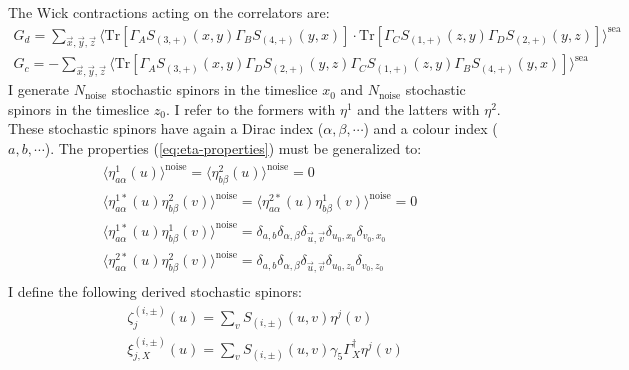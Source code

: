 \documentclass[english, LaM, oneside, noexaminfo]{sapthesis}
\begin{document}
\newline
The Wick contractions acting on the correlators are:
\begin{equation}\label{eq:contractions-stochastic-method}
    \begin{gathered}
        G_d = \sum_{\vec x, \vec y, \vec z} \bigg\langle \text{Tr}\left[\Gamma_A S_{(3,+)}(x,y)\Gamma_B S_{(4,+)}(y,x)\right]\cdot\text{Tr}\left[\Gamma_C S_{(1,+)}(z,y)\Gamma_D S_{(2,+)}(y,z)\right] \bigg\rangle^{\text{sea}} \\
        G_c = - \sum_{\vec x, \vec y, \vec z} \bigg\langle \text{Tr}\left[\Gamma_A S_{(3,+)}(x,y)\Gamma_D S_{(2,+)}(y,z)\Gamma_C S_{(1,+)}(z,y)\Gamma_B S_{(4,+)}(y,x)\right] \bigg\rangle^{\text{sea}}
    \end{gathered}
\end{equation}
\newline
I generate $N_{\text{noise}}$ stochastic spinors in the timeslice $x_0$ and $N_{\text{noise}}$ stochastic spinors in the timeslice $z_0$.
I refer to the formers with $\eta^{1}$ and the latters with $\eta^{2}$.
These stochastic spinors have again a Dirac index ($\alpha,\beta,\cdots$) and a colour index ($a,b,\cdots$).
The properties (\ref{eq:eta-properties}) must be generalized to:
\begin{equation}
    \begin{gathered}
        \langle \eta^{1}_{a\alpha} (u) \rangle^{\text{noise}} = \langle \eta^{2}_{b\beta} (u) \rangle^{\text{noise}} = 0 \\
        \langle \eta^{1*}_{a\alpha} (u) \eta^{2}_{b\beta} (v) \rangle^{\text{noise}} = \langle \eta^{2*}_{a\alpha} (u) \eta^{1}_{b\beta} (v) \rangle^{\text{noise}} = 0 \\
        \langle \eta^{1*}_{a\alpha} (u) \eta^{1}_{b\beta} (v) \rangle^{\text{noise}} = \delta_{a,b} \delta_{\alpha,\beta} \delta_{\vec u, \vec v} \delta_{u_0,x_0} \delta_{v_0,x_0} \\
        \langle \eta^{2*}_{a\alpha} (u) \eta^{2}_{b\beta} (v) \rangle^{\text{noise}} = \delta_{a,b} \delta_{\alpha,\beta} \delta_{\vec u, \vec v} \delta_{u_0,z_0} \delta_{v_0,z_0} \\
    \end{gathered}
\end{equation}
I define the following derived stochastic spinors:
\begin{equation}
    \begin{aligned}
        & \zeta^{(i,\pm)}_{j} (u) = \sum_{v} S_{(i,\pm)}(u,v)\eta^{j}(v) \\
        & \xi^{(i,\pm)}_{j,X} (u) = \sum_{v} S_{(i,\pm)}(u,v) \gamma_5 \Gamma_X^\dag \eta^{j}(v)
    \end{aligned}
\end{equation}
\end{document}
